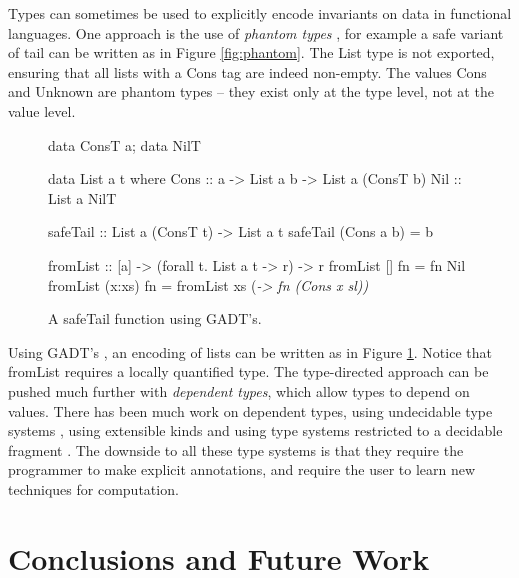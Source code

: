 \documentclass[preprint]{sigplanconf}
\newcommand{\C}[1]{\textsf{#1}}
\begin{document}
Types can sometimes be used to explicitly encode invariants on data in functional languages. One approach is the use of \textit{phantom types} \citep{fluet:phantom}, for example a safe variant of \C{tail} can be written as in Figure \ref{fig:phantom}. The \C{List} type is not exported, ensuring that all lists with a \C{Cons} tag are indeed non-empty. The values \C{Cons} and \C{Unknown} are phantom types -- they exist only at the type level, not at the value level.

\begin{figure}
\begin{code}
data ConsT a; data NilT

data List a t where
    Cons  :: a -> List a b -> List a (ConsT b)
    Nil   :: List a NilT

safeTail :: List a (ConsT t) -> List a t
safeTail (Cons a b) = b

fromList :: [a] -> (forall t. List a t -> r) -> r
fromList []      fn = fn Nil
fromList (x:xs)  fn = fromList xs (\sl -> fn (Cons x sl))
\end{code}
\caption{A \C{safeTail} function using GADT's.}
\label{fig:gadt}
\end{figure}

Using GADT's \citep{spj:gadt}, an encoding of lists can be written as in Figure \ref{fig:gadt}. Notice that \C{fromList} requires a locally quantified type. The type-directed approach can be pushed much further with \textit{dependent types}, which allow types to depend on values. There has been much work on dependent types, using undecidable type systems \citep{epigram}, using extensible kinds \citep{omega} and using type systems restricted to a decidable fragment \citep{xi:dependent_practical}. The downside to all these type systems is that they require the programmer to make explicit annotations, and require the user to learn new techniques for computation.


\section{Conclusions and Future Work}
\label{sec:conclusion}
\end{document}
